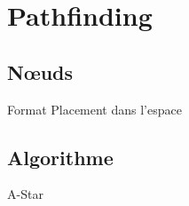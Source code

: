 \section{Pathfinding}

\subsection{N\oe uds}
Format
Placement dans l'espace

\subsection{Algorithme}
A-Star